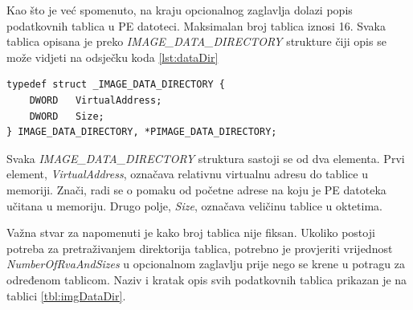 \documentclass[times, utf8, diplomski, numeric]{fer}
\begin{document}
Kao što je već spomenuto, na kraju opcionalnog zaglavlja dolazi popis podatkovnih tablica u PE datoteci. Maksimalan broj tablica iznosi 16. Svaka tablica opisana je preko \emph{IMAGE\_DATA\_DIRECTORY} strukture čiji opis se može vidjeti na odsječku koda \ref{lst:dataDir}

\begin{lstlisting}[frame=single, caption=IMAGE\_DATA\_DIRECTORY struktura, label={lst:dataDir}]
typedef struct _IMAGE_DATA_DIRECTORY {
	DWORD   VirtualAddress;
	DWORD   Size;
} IMAGE_DATA_DIRECTORY, *PIMAGE_DATA_DIRECTORY;
\end{lstlisting}

Svaka \emph{IMAGE\_DATA\_DIRECTORY} struktura sastoji se od dva
elementa. Prvi element, \emph{VirtualAddress}, označava relativnu
virtualnu adresu do tablice u memoriji. Znači, radi se o pomaku
od početne adrese na koju je PE datoteka učitana u memoriju.
Drugo polje, \emph{Size}, označava veličinu tablice u oktetima.

Važna stvar za napomenuti je kako broj tablica nije fiksan.
Ukoliko postoji potreba za pretraživanjem direktorija tablica,
potrebno je provjeriti vrijednost \emph{NumberOfRvaAndSizes} u
opcionalnom zaglavlju prije nego se krene u potragu za određenom
tablicom. Naziv i kratak opis svih podatkovnih tablica prikazan
je na tablici \ref{tbl:imgDataDir}.
\end{document}
